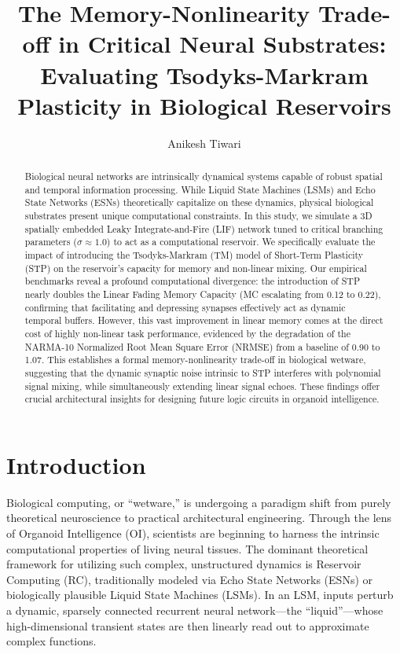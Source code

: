 \documentclass[12pt, a4paper]{article}
\title{\textbf{The Memory-Nonlinearity Trade-off in Critical Neural Substrates: Evaluating Tsodyks-Markram Plasticity in Biological Reservoirs}}
\author{Anikesh Tiwari}
\date{}
\begin{document}
\maketitle

\begin{abstract}
Biological neural networks are intrinsically dynamical systems capable of robust spatial and temporal information processing. While Liquid State Machines (LSMs) and Echo State Networks (ESNs) theoretically capitalize on these dynamics, physical biological substrates present unique computational constraints. In this study, we simulate a 3D spatially embedded Leaky Integrate-and-Fire (LIF) network tuned to critical branching parameters ($\sigma \approx 1.0$) to act as a computational reservoir. We specifically evaluate the impact of introducing the Tsodyks-Markram (TM) model of Short-Term Plasticity (STP) on the reservoir's capacity for memory and non-linear mixing. Our empirical benchmarks reveal a profound computational divergence: the introduction of STP nearly doubles the Linear Fading Memory Capacity (MC escalating from 0.12 to 0.22), confirming that facilitating and depressing synapses effectively act as dynamic temporal buffers. However, this vast improvement in linear memory comes at the direct cost of highly non-linear task performance, evidenced by the degradation of the NARMA-10 Normalized Root Mean Square Error (NRMSE) from a baseline of 0.90 to 1.07. This establishes a formal memory-nonlinearity trade-off in biological wetware, suggesting that the dynamic synaptic noise intrinsic to STP interferes with polynomial signal mixing, while simultaneously extending linear signal echoes. These findings offer crucial architectural insights for designing future logic circuits in organoid intelligence.
\end{abstract}

\section{Introduction}
Biological computing, or ``wetware,'' is undergoing a paradigm shift from purely theoretical neuroscience to practical architectural engineering. Through the lens of Organoid Intelligence (OI), scientists are beginning to harness the intrinsic computational properties of living neural tissues. The dominant theoretical framework for utilizing such complex, unstructured dynamics is Reservoir Computing (RC), traditionally modeled via Echo State Networks (ESNs) or biologically plausible Liquid State Machines (LSMs). In an LSM, inputs perturb a dynamic, sparsely connected recurrent neural network—the ``liquid''—whose high-dimensional transient states are then linearly read out to approximate complex functions.
\end{document}
